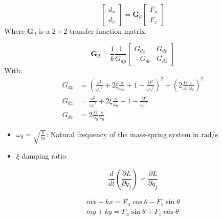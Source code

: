 \documentclass{ISMA_USD2020}
\begin{document}
\begin{equation}
\begin{bmatrix} d_u \\ d_v \end{bmatrix} =
\bm{G}_d
\begin{bmatrix} F_u \\ F_v \end{bmatrix}
\end{equation}
Where \(\bm{G}_d\) is a \(2 \times 2\) transfer function matrix.

\begin{equation}
\bm{G}_d = \frac{1}{k} \frac{1}{G_{dp}}
\begin{bmatrix}
   G_{dz} & G_{dc} \\
  -G_{dc} & G_{dz}
\end{bmatrix}
\end{equation}
With:
\begin{subequations}
  \begin{align}
    G_{dp} &= \left( \frac{s^2}{{\omega_0}^2} + 2 \xi \frac{s}{\omega_0} + 1 - \frac{{\Omega}^2}{{\omega_0}^2} \right)^2 + \left( 2 \frac{\Omega}{\omega_0} \frac{s}{\omega_0} \right)^2 \\
    G_{dz} &= \frac{s^2}{{\omega_0}^2} + 2 \xi \frac{s}{\omega_0} + 1 - \frac{{\Omega}^2}{{\omega_0}^2} \\
    G_{dc} &= 2 \frac{\Omega}{\omega_0} \frac{s}{\omega_0}
  \end{align}
\end{subequations}



\begin{itemize}
\item \(\omega_0 = \sqrt{\frac{k}{m}}\): Natural frequency of the mass-spring system in \(\si{\radian/\s}\)
\item \(\xi\) damping ratio
\end{itemize}



\begin{equation}
\label{eq:lagrange_second_kind}
  \frac{d}{dt} \left( \frac{\partial L}{\partial \dot{q}_j} \right) = \frac{\partial L}{\partial q_j}
\end{equation}

\begin{subequations}
\label{eq:eom_mixed}
  \begin{align}
    m\ddot{x} + kx = F_u \cos{\theta} - F_v \sin{\theta}\\
    m\ddot{y} + ky = F_u \sin{\theta} + F_v \cos{\theta}
  \end{align}
\end{subequations}
\end{document}
